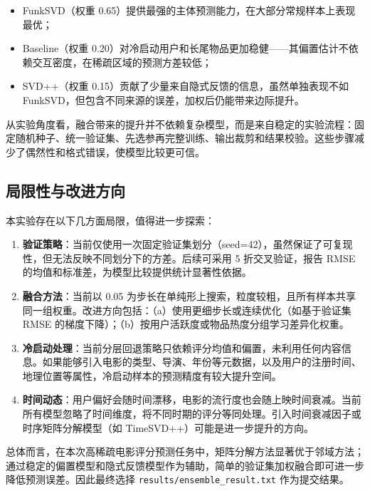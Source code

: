 \documentclass[UTF8,a4paper,10pt]{ctexart}
\begin{document}
\begin{itemize}
    \item FunkSVD（权重 0.65）提供最强的主体预测能力，在大部分常规样本上表现最优；
    \item Baseline（权重 0.20）对冷启动用户和长尾物品更加稳健——其偏置估计不依赖交互密度，在稀疏区域的预测方差较低；
    \item SVD++（权重 0.15）贡献了少量来自隐式反馈的信息，虽然单独表现不如 FunkSVD，但包含不同来源的误差，加权后仍能带来边际提升。
\end{itemize}

从实验角度看，融合带来的提升并不依赖复杂模型，而是来自稳定的实验流程：固定随机种子、统一验证集、先选参再完整训练、输出裁剪和结果校验。这些步骤减少了偶然性和格式错误，使模型比较更可信。

\subsection{局限性与改进方向}

本实验存在以下几方面局限，值得进一步探索：

\begin{enumerate}
    \item \textbf{验证策略}：当前仅使用一次固定验证集划分（seed=42），虽然保证了可复现性，但无法反映不同划分下的方差。后续可采用 5 折交叉验证，报告 RMSE 的均值和标准差，为模型比较提供统计显著性依据。

    \item \textbf{融合方法}：当前以 0.05 为步长在单纯形上搜索，粒度较粗，且所有样本共享同一组权重。改进方向包括：（a）使用更细步长或连续优化（如基于验证集 RMSE 的梯度下降）；（b）按用户活跃度或物品热度分组学习差异化权重。

    \item \textbf{冷启动处理}：当前分层回退策略只依赖评分均值和偏置，未利用任何内容信息。如果能够引入电影的类型、导演、年份等元数据，以及用户的注册时间、地理位置等属性，冷启动样本的预测精度有较大提升空间。

    \item \textbf{时间动态}：用户偏好会随时间漂移，电影的流行度也会随上映时间衰减。当前所有模型忽略了时间维度，将不同时期的评分等同处理。引入时间衰减因子或时序矩阵分解模型（如 TimeSVD++）可能是进一步提升的方向。
\end{enumerate}

总体而言，在本次高稀疏电影评分预测任务中，矩阵分解方法显著优于邻域方法；通过稳定的偏置模型和隐式反馈模型作为辅助，简单的验证集加权融合即可进一步降低预测误差。因此最终选择 \texttt{results/ensemble\_result.txt} 作为提交结果。
\end{document}
